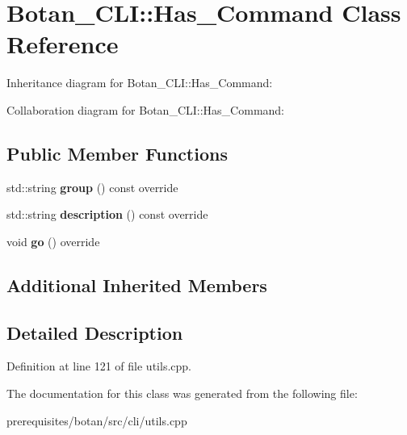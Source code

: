 \hypertarget{class_botan___c_l_i_1_1_has___command}{}\section{Botan\+\_\+\+C\+LI\+:\+:Has\+\_\+\+Command Class Reference}
\label{class_botan___c_l_i_1_1_has___command}


Inheritance diagram for Botan\+\_\+\+C\+LI\+:\+:Has\+\_\+\+Command\+:


Collaboration diagram for Botan\+\_\+\+C\+LI\+:\+:Has\+\_\+\+Command\+:
\subsection*{Public Member Functions}
\begin{DoxyCompactItemize}
\item 
\mbox{\label{class_botan___c_l_i_1_1_has___command_a2f726386d0927f55cecf66a4efddfd84}} 
std\+::string {\bfseries group} () const override
\item 
\mbox{\label{class_botan___c_l_i_1_1_has___command_aae86371842784bc1e4a0ea751e8b6de1}} 
std\+::string {\bfseries description} () const override
\item 
\mbox{\label{class_botan___c_l_i_1_1_has___command_a267052f361d55c0a6e135023c7cbfb64}} 
void {\bfseries go} () override
\end{DoxyCompactItemize}
\subsection*{Additional Inherited Members}


\subsection{Detailed Description}


Definition at line 121 of file utils.\+cpp.



The documentation for this class was generated from the following file\+:\begin{DoxyCompactItemize}
\item 
prerequisites/botan/src/cli/utils.\+cpp\end{DoxyCompactItemize}
